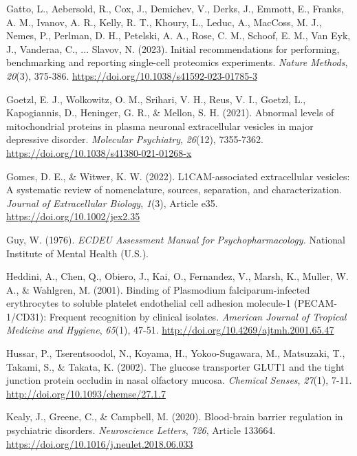 \documentclass[authordate, empirical]{jote-new-article}
\begin{document}
	Gatto, L., Aebersold, R., Cox, J., Demichev, V., Derks, J., Emmott, E., Franks, A. M., Ivanov, A. R., Kelly, R. T., Khoury, L., Leduc, A., MacCoss, M. J., Nemes, P., Perlman, D. H., Petelski, A. A., Rose, C. M., Schoof, E. M., Van Eyk, J., Vanderaa, C., ... Slavov, N. (2023). Initial recommendations for performing, benchmarking and reporting single-cell proteomics experiments. \emph{Nature Methods},\emph{ 20}(3), 375-386. \url{https://doi.org/10.1038/s41592-023-01785-3}



	Goetzl, E. J., Wolkowitz, O. M., Srihari, V. H., Reus, V. I., Goetzl, L., Kapogiannis, D., Heninger, G. R., \& Mellon, S. H. (2021). Abnormal levels of mitochondrial proteins in plasma neuronal extracellular vesicles in major depressive disorder. \emph{Molecular Psychiatry},\emph{ 26}(12), 7355-7362. \url{https://doi.org/10.1038/s41380-021-01268-x}



	Gomes, D. E., \& Witwer, K. W. (2022). L1CAM-associated extracellular vesicles: A systematic review of nomenclature, sources, separation, and characterization. \emph{Journal of Extracellular Biology},\emph{ 1}(3), Article e35. \url{https://doi.org/10.1002/jex2.35}



	Guy, W. (1976). \emph{ECDEU Assessment Manual for Psychopharmacology. }National Institute of Mental Health (U.S.).



	Heddini, A., Chen, Q., Obiero, J., Kai, O., Fernandez, V., Marsh, K., Muller, W. A., \& Wahlgren, M. (2001). Binding of Plasmodium falciparum-infected erythrocytes to soluble platelet endothelial cell adhesion molecule-1 (PECAM-1/CD31): Frequent recognition by clinical isolates. \emph{American Journal of Tropical Medicine and Hygiene},\emph{ 65}(1), 47-51. \url{http://doi.org/10.4269/ajtmh.2001.65.47}



	Hussar, P., Tserentsoodol, N., Koyama, H., Yokoo-Sugawara, M., Matsuzaki, T., Takami, S., \& Takata, K. (2002). The glucose transporter GLUT1 and the tight junction protein occludin in nasal olfactory mucosa. \emph{Chemical Senses},\emph{ 27}(1), 7-11. \url{http://doi.org/10.1093/chemse/27.1.7} 
	
	Kealy, J., Greene, C., \& Campbell, M. (2020). Blood-brain barrier regulation in psychiatric disorders. \emph{Neuroscience Letters},\emph{ 726}, Article 133664. \url{https://doi.org/10.1016/j.neulet.2018.06.033}
\end{document}
